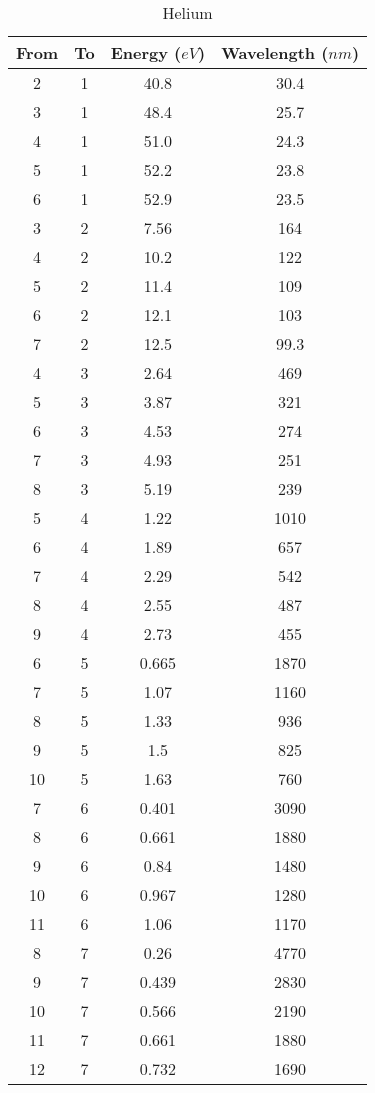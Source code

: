 \documentclass[paper=a4, fontsize=12pt]{scrartcl}
\begin{document}
\begin{table}[h]
\caption {Helium}
\begin{center}
\begin{tabular}{| c | c | c | c |}
\hline
 From & To & Energy ($eV$) & Wavelength ($nm$)\\
 \hline
 2 & 1 & 40.8 & 30.4\\
 3 & 1 & 48.4 & 25.7\\
 4 & 1 & 51.0 & 24.3\\
 5 & 1 & 52.2 & 23.8\\
 6 & 1 & 52.9 & 23.5\\
 3 & 2 & 7.56 & 164\\
 4 & 2 & 10.2 & 122\\
 5 & 2 & 11.4 & 109\\
 6 & 2 & 12.1 & 103\\
 7 & 2 & 12.5 & 99.3\\
 4 & 3 & 2.64 & 469\\
 5 & 3 & 3.87 & 321\\
 6 & 3 & 4.53 & 274\\
 7 & 3 & 4.93 & 251\\
 8 & 3 & 5.19 & 239\\
 5 & 4 & 1.22 & 1010\\
 6 & 4 & 1.89 & 657\\
 7 & 4 & 2.29 & 542\\
 8 & 4 & 2.55 & 487\\
 9 & 4 & 2.73 & 455\\
 6 & 5 & 0.665 & 1870\\
 7 & 5 & 1.07 & 1160\\
 8 & 5 & 1.33 & 936\\
 9 & 5 & 1.5 & 825\\
 10 & 5 & 1.63 & 760\\
 7 & 6 & 0.401 & 3090\\
 8 & 6 & 0.661 & 1880\\
 9 & 6 & 0.84 & 1480\\
 10 & 6 & 0.967 & 1280\\
 11 & 6 & 1.06 & 1170\\
 8 & 7 & 0.26 & 4770\\
 9 & 7 & 0.439 & 2830\\
 10 & 7 & 0.566 & 2190\\
 11 & 7 & 0.661 & 1880\\
 12 & 7 & 0.732 & 1690\\
 \hline
\end{tabular}
\end{center}
\end{table}
\end{document}
